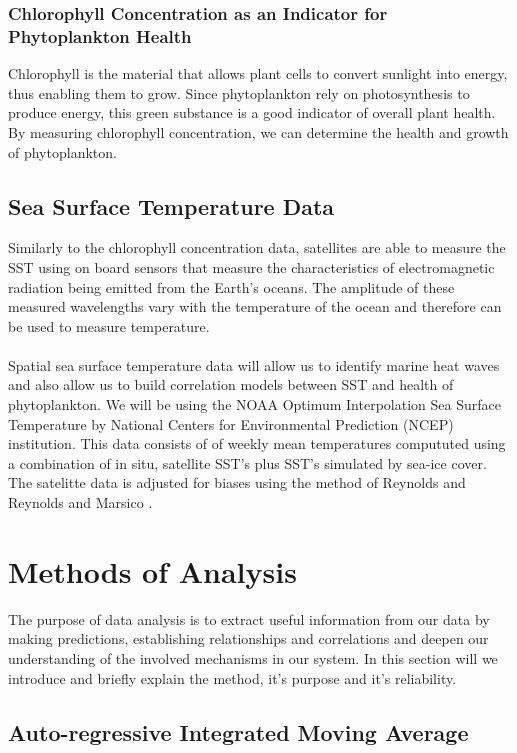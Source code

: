 \subsubsection{Chlorophyll Concentration as an Indicator for Phytoplankton Health}\label{subsec:chl phyt}

Chlorophyll is the material that allows plant cells to convert sunlight into energy, thus enabling them to grow. Since phytoplankton rely on photosynthesis to produce energy, this green substance is a good indicator of overall plant health. By measuring chlorophyll concentration, we can determine the health and growth of phytoplankton.

\subsection{Sea Surface Temperature Data}

Similarly to the chlorophyll concentration data, satellites are able to measure the SST using on board sensors that measure the characteristics of electromagnetic radiation being emitted from the Earth's oceans. The amplitude of these measured wavelengths vary with the temperature of the ocean and therefore can be used to measure temperature.
\\\\
Spatial sea surface temperature data will allow us to identify marine heat waves and also allow us to build correlation models between SST and health of phytoplankton. We will be using the NOAA Optimum Interpolation Sea Surface Temperature by National Centers for Environmental Prediction (NCEP) institution. This data consists of of weekly mean temperatures compututed using a combination of in situ, satellite SST's plus SST's simulated by sea-ice cover. The satelitte data is adjusted for biases using the method of Reynolds \cite{reynolds1988real} and Reynolds and Marsico \cite{1993reynolds}.

\section{Methods of Analysis}

The purpose of data analysis is to extract useful information from our data by making predictions, establishing relationships and correlations and deepen our understanding of the involved mechanisms in our system. In this section will we introduce and briefly explain the method, it's purpose and it's reliability.

\subsection{Auto-regressive Integrated Moving Average}\label{subsec:ARIMA}

